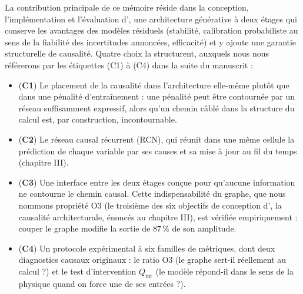 La contribution principale de ce mémoire réside dans la conception, l'implémentation et l'évaluation d'\Oracle{}, une architecture générative à deux étages qui conserve les avantages des modèles résiduels (stabilité, calibration probabiliste au sens de la fiabilité des incertitudes annoncées, efficacité) et y ajoute une garantie structurelle de causalité. Quatre choix la structurent, auxquels nous nous référerons par les étiquettes (C1) à (C4) dans la suite du manuscrit :
\begin{itemize}[leftmargin=1.2em, itemsep=3pt]
    \item (\textbf{C1}) Le placement de la causalité dans l'architecture elle-même plutôt que dans une pénalité d'entraînement : une pénalité peut être contournée par un réseau suffisamment expressif, alors qu'un chemin câblé dans la structure du calcul est, par construction, incontournable.
    \item (\textbf{C2}) Le réseau causal récurrent (RCN), qui réunit dans une même cellule la prédiction de chaque variable par ses causes et sa mise à jour au fil du temps (chapitre III).
    \item (\textbf{C3}) Une interface entre les deux étages conçue pour qu'aucune information ne contourne le chemin causal. Cette indispensabilité du graphe, que nous nommons propriété O3 (le troisième des six objectifs de conception d'\Oracle{}, la causalité architecturale, énoncés au chapitre III), est vérifiée empiriquement : couper le graphe modifie la sortie de $87\,\%$ de son amplitude.
    \item (\textbf{C4}) Un protocole expérimental à six familles de métriques, dont deux diagnostics causaux originaux : le ratio O3 (le graphe sert-il réellement au calcul ?) et le test d'intervention $Q_{\mathrm{int}}$ (le modèle répond-il dans le sens de la physique quand on force une de ses entrées ?).
\end{itemize}

